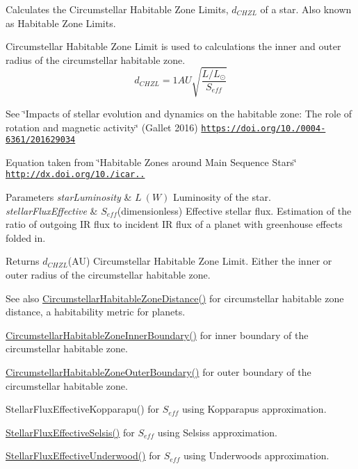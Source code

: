 Calculates the Circumstellar Habitable Zone Limits, $d_{CHZL}$ of a star. Also known as Habitable Zone Limits. 

Circumstellar Habitable Zone Limit is used to calculations the inner and outer radius of the circumstellar habitable zone. \[d_{CHZL}=1AU \sqrt{ \frac{L/L_\odot}{S_{eff}} }\]

See \char`\"{}\+Impacts of stellar evolution and dynamics on the habitable zone\+: The role of rotation and magnetic activity\char`\"{} (Gallet 2016) \href{https://doi.org/10.1051/0004-6361/201629034}{\tt https\+://doi.\+org/10./0004-\/6361/201629034}

Equation taken from \char`\"{}\+Habitable Zones around Main Sequence Stars\char`\"{} \href{http://dx.doi.org/10.1006/icar.1993.1010}{\tt http\+://dx.\+doi.\+org/10./icar..}


\begin{DoxyParams}{Parameters}
{\em star\+Luminosity} & $L\ (W)$ Luminosity of the star. \\
\hline
{\em stellar\+Flux\+Effective} & $S_{eff}$(dimensionless) Effective stellar flux. Estimation of the ratio of outgoing IR flux to incident IR flux of a planet with greenhouse effects folded in. \\
\hline
\end{DoxyParams}
\begin{DoxyReturn}{Returns}
$d_{CHZL}$(AU) Circumstellar Habitable Zone Limit. Either the inner or outer radius of the circumstellar habitable zone. 
\end{DoxyReturn}
\begin{DoxySeeAlso}{See also}
\mbox{\hyperlink{group___astrophysics_gacf3a720793cdb27f6d93b170b44e81be}{Circumstellar\+Habitable\+Zone\+Distance()}} for circumstellar habitable zone distance, a habitability metric for planets. 

\mbox{\hyperlink{group___astrophysics_ga9ee2e8023cb444aa4638c962788b5853}{Circumstellar\+Habitable\+Zone\+Inner\+Boundary()}} for inner boundary of the circumstellar habitable zone. 

\mbox{\hyperlink{group___astrophysics_gaa47fcde814ba8007de800e930fc0a08d}{Circumstellar\+Habitable\+Zone\+Outer\+Boundary()}} for outer boundary of the circumstellar habitable zone. 

Stellar\+Flux\+Effective\+Kopparapu() for $S_{eff}$ using Kopparapu\textquotesingle{}s approximation. 

\mbox{\hyperlink{group___astrophysics_ga3ce3a04fec7b1c8fb66ac54270ce3902}{Stellar\+Flux\+Effective\+Selsis()}} for $S_{eff}$ using Selsis\textquotesingle{}s approximation. 

\mbox{\hyperlink{group___astrophysics_ga34d1e39bce17904bc6d383f1935c79d6}{Stellar\+Flux\+Effective\+Underwood()}} for $S_{eff}$ using Underwood\textquotesingle{}s approximation. 
\end{DoxySeeAlso}
\mbox{\label{group___astrophysics_gaa47fcde814ba8007de800e930fc0a08d}} 
